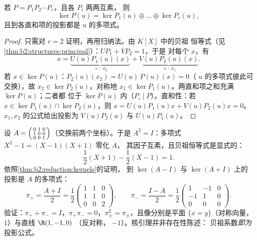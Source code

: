 \begin{theorem}[核分解引理]\label{thm:b2:reduction:kernels}
若 $P = P_1 P_2 \cdots P_r$，且各 $P_i$ 两两互素，
则
\[
\ker P(u) = \ker P_1(u) \oplus \dots \oplus \ker P_r(u),
\]
且到各直和项的投影都是 $u$ 的多项式。
\end{theorem}

\begin{proof}
只需对 $r = 2$ 证明，再用归纳法。由 $K[X]$ 中的贝祖
恒等式（见\cref{thm:b2:structures:principal}）：$U P_1 + V P_2 = 1$，于是
对每个 $x$，有
\[
x = \underbrace{U(u)P_1(u)(x)}_{=:\,x_2}
+ \underbrace{V(u)P_2(u)(x)}_{=:\,x_1}.
\]
若 $x \in \ker P(u)$：$P_2(u)(x_2) = U(u)\,P(u)(x) = 0$（
$u$ 的多项式彼此可交换），故 $x_2 \in \ker P_2(u)$，对称地 $x_1
\in \ker P_1(u)$。两直和项之和充满 $\ker P(u)$；二者都
位于 $\ker P(u)$ 内（$P_i \mid P$）。直和性：若 $x \in \ker P_1(u)
\cap \ker P_2(u)$，则 $x = U(u)P_1(u)x + V(u)P_2(u)x = 0$。
$x_1, x_2$ 的公式给出投影为 $V(u)P_2(u)$ 与
$U(u)P_1(u)$。
\end{proof}

\begin{example}[显式投影的核引理]\label{ex:b2:reduction:projectorswork}
设 $A = \begin{psmallmatrix}0 & 1 & 0\\ 1 & 0 & 0\\ 0 & 0 &
1\end{psmallmatrix}$（交换前两个坐标）。于是 $A^2
= I$：多项式 $X^2 - 1 = (X - 1)(X + 1)$ 零化 $A$，
其因子互素，且贝祖恒等式是显式的：
\[
\frac{1}{2}(X + 1) - \frac12(X - 1) = 1 .
\]
依照\cref{thm:b2:reduction:kernels}的证明，
到 $\ker(A - I)$ 与 $\ker(A + I)$ 上的投影是
$A$ 的多项式：
\[
\pi_+ = \frac{A + I}{2} = \frac12\begin{pmatrix}
1 & 1 & 0\\ 1 & 1 & 0\\ 0 & 0 & 2\end{pmatrix},
\qquad
\pi_- = \frac{I - A}{2} = \frac12\begin{pmatrix}
1 & -1 & 0\\ -1 & 1 & 0\\ 0 & 0 & 0\end{pmatrix}.
\]
验证：$\pi_+ + \pi_- = I$，$\pi_+\pi_- = 0$，$\pi_\pm^2 =
\pi_\pm$，且像分别是平面 $\{x = y\}$（对称向量，
$1$）与直线 $\R(1, -1, 0)$
（反对称， $-1$）。核引理并非存在性陈述：
贝祖系数\emph{即为}
投影公式。
\end{example}

